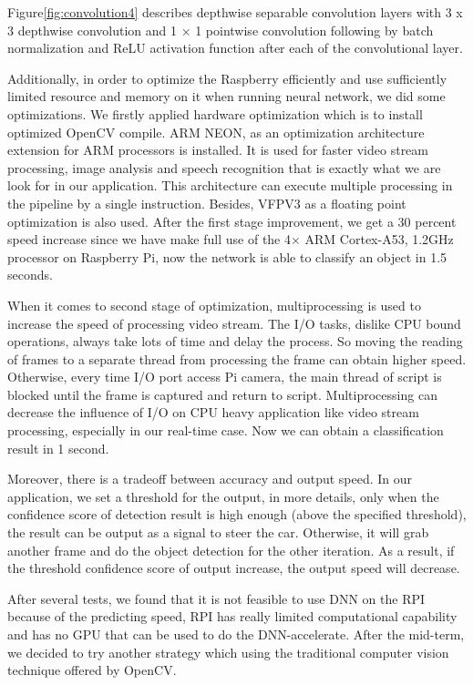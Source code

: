 \documentclass[11pt, titlepage]{article} %
\begin{document}
Figure\ref{fig:convolution4} describes depthwise separable convolution layers with 3 x 3 depthwise convolution and 1 × 1 pointwise convolution following by batch normalization and ReLU activation function after each of the convolutional layer. 

Additionally, in order to optimize the Raspberry efficiently and use sufficiently limited resource and memory on it when running neural network, we did some optimizations. We firstly applied hardware optimization which is to install optimized OpenCV compile. ARM NEON, as an optimization architecture extension for ARM processors is installed. It is used for faster video stream processing, image analysis and speech recognition that is exactly what we are look for in our application. This architecture can execute multiple processing in the pipeline by a single instruction. Besides, VFPV3 as a floating point optimization is also used. After the first stage improvement, we get a 30 percent speed increase since we have make full use of the 4× ARM Cortex-A53, 1.2GHz processor on Raspberry Pi, now the network is able to classify an object in 1.5 seconds. 

When it comes to second stage of optimization, multiprocessing is used to increase the speed of processing video stream. The I/O tasks, dislike CPU bound operations, always take lots of time and delay the process. So moving the reading of frames to a separate thread from processing the frame can obtain higher speed. Otherwise, every time I/O port access Pi camera, the main thread of script is blocked until the frame is captured and return to script. Multiprocessing can decrease the influence of I/O on CPU heavy application like video stream processing, especially in our real-time case. Now we can obtain a classification result in 1 second.

Moreover, there is a tradeoff between accuracy and output speed. In our application, we set a threshold for the output, in more details, only when the confidence score of detection result is high enough (above the specified threshold), the result can be output as a signal to steer the car. Otherwise, it will grab another frame and do the object detection for the other iteration. As a result, if the threshold confidence score of output increase, the output speed will decrease. 

After several tests, we found that it is not feasible to use DNN on the RPI because of the predicting speed, RPI has really limited computational capability and has no GPU that can be used to do the DNN-accelerate. After the mid-term, we decided to try another strategy which using the traditional computer vision technique offered by OpenCV.
\end{document}
